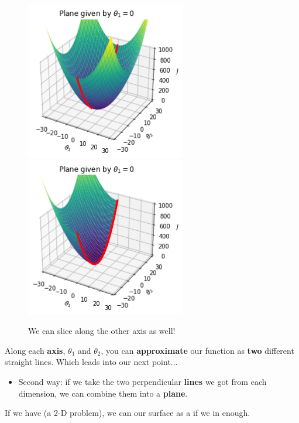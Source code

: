         \begin{figure}[H]
                \includegraphics[width=70mm,scale=0.5]{images/gradient_descent_images/theta1_eq_0_unsliced.png}
                \includegraphics[width=70mm,scale=0.5]{images/gradient_descent_images/theta1_eq_0_sliced.png}
            
            \caption*{We can slice along the other axis as well!}
        \end{figure}

        Along each \textbf{axis}, $\theta_1$ and $\theta_2$, you can \textbf{approximate} our function as \textbf{two} different straight lines. Which leads into our next point...
        
        \begin{itemize}
            \item Second way: if we take the two perpendicular \textbf{lines} we got from each dimension, we can combine them into a \textbf{plane}.\\
        \end{itemize}
        
        \begin{concept}
            If we have  (a 2-D problem), we can  our surface as a  if we  in enough.
        \end{concept}

